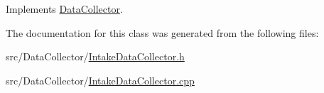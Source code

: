 Implements \mbox{\hyperlink{classDataCollector_af01ea961314be2164f39e6d4cd59e443}{Data\+Collector}}.



The documentation for this class was generated from the following files\+:\begin{DoxyCompactItemize}
\item 
src/\+Data\+Collector/\mbox{\hyperlink{IntakeDataCollector_8h}{Intake\+Data\+Collector.\+h}}\item 
src/\+Data\+Collector/\mbox{\hyperlink{IntakeDataCollector_8cpp}{Intake\+Data\+Collector.\+cpp}}\end{DoxyCompactItemize}
